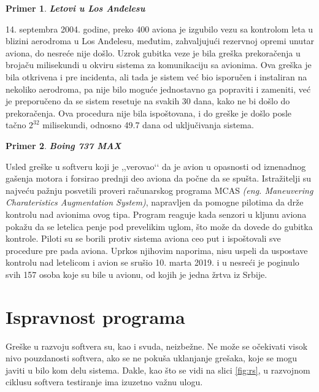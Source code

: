 \documentclass[a4paper]{article}
\newtheorem{primer}{Primer}[section]
\begin{document}
\begin{primer}
\textbf{Letovi u Los Anđelesu}
\end{primer}
14. septembra 2004. godine, preko 400 aviona je izgubilo vezu sa kontrolom leta u blizini aerodroma u Los Anđelesu, međutim, zahvaljujući rezervnoj opremi unutar aviona, do nesreće nije došlo. Uzrok gubitka veze je bila greška prekoračenja u brojaču milisekundi u okviru sistema za komunikaciju sa avionima. Ova greška je bila otkrivena i pre incidenta, ali tada je sistem već bio isporučen i instaliran na nekoliko aerodroma, pa nije bilo moguće jednostavno ga popraviti i zameniti, već je preporučeno da se sistem resetuje na svakih 30 dana, kako ne bi došlo do prekoračenja. Ova procedura nije bila ispoštovana, i do greške je došlo posle tačno $2^{32}$ milisekundi, odnosno 49.7 dana od uključivanja sistema.\\

\begin{primer}
\textbf{Boing 737 MAX}
\end{primer}
Usled greške u softveru koji je ,,verovao‘‘ da je avion u opasnosti od iznenadnog gašenja motora i forsirao prednji deo aviona da počne da se spušta. Istražitelji su najveću pažnju posvetili proveri računarskog programa MCAS \emph{(eng. Maneuvering Charateristics Augmentation System)}, napravljen da pomogne pilotima da drže kontrolu nad avionima ovog tipa. Program reaguje kada senzori u kljunu aviona pokažu da se letelica penje pod prevelikim uglom, što može da dovede do gubitka kontrole. Piloti su se borili protiv sistema aviona ceo put i ispoštovali sve procedure pre pada aviona. Uprkos njihovim naporima, nisu uspeli da uspostave kontrolu nad letelicom i avion se srušio 10. marta 2019. i u nesreći je poginulo svih 157 osoba koje su bile u avionu, od kojih je jedna žrtva iz Srbije.\\


\section{Ispravnost programa}
\label{sec:ispravnost}
Greške u razvoju softvera su, kao i svuda, neizbežne. Ne može se očekivati visok nivo pouzdanosti softvera, ako se ne pokuša uklanjanje grešaka, koje se mogu javiti u bilo kom delu sistema. Dakle, kao što se vidi na slici \ref{fig:rs}, u razvojnom ciklusu softvera testiranje ima izuzetno važnu ulogu.
\end{document}
